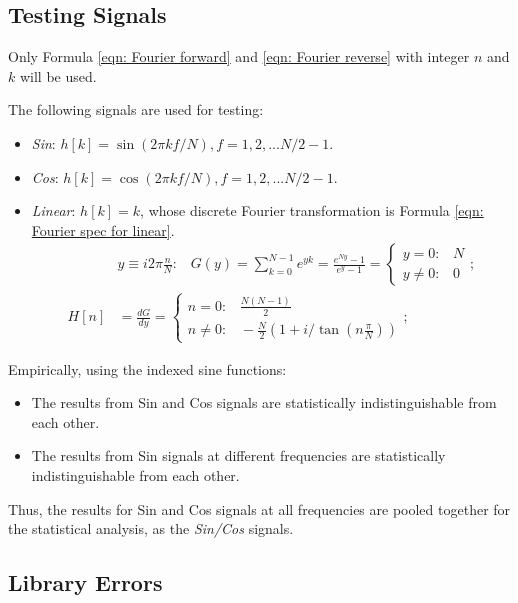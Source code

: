 \documentclass[twoside]{article}
\numberwithin{equation}{section}
\newcommand{\eqspace}{\;\;\;}
\begin{document}
\subsection{Testing Signals}

Only Formula \eqref{eqn: Fourier forward} and \eqref{eqn: Fourier reverse} with integer $n$ and $k$ will be used.

The following signals are used for testing:
\begin{itemize}
\item \emph{Sin}: $h[k] = \sin(2\pi k f/N), f = 1, 2, ... N/2 -1$.

\item \emph{Cos}: $h[k] = \cos(2\pi k f/N), f = 1, 2, ... N/2 -1$.

\item \emph{Linear}: $h[k] = k$, whose discrete Fourier transformation is Formula \eqref{eqn: Fourier spec for linear}.
\begin{align}
& y \equiv i 2\pi \frac{n}{N}: \eqspace G(y) = \sum_{k=0}^{N-1}  e^{y k} = \frac{e^{N y} - 1}{e^y - 1}
 = \begin{cases} y = 0: \eqspace N \\ y \neq 0: \eqspace 0 \end{cases}; \nonumber \\
\label{eqn: Fourier spec for linear}
H[n] &= \frac{d G}{d y} = \begin{cases} n = 0: \eqspace \frac{N (N-1)}{2} \\ n \neq 0: \eqspace - \frac{N}{2}(1 + i /\tan(n \frac{\pi}{N})) \end{cases};
\end{align}

\end{itemize}

Empirically, using the indexed sine functions:
\begin{itemize}
\item The results from Sin and Cos signals are statistically indistinguishable from each other.

\item The results from Sin signals at different frequencies are statistically indistinguishable from each other.
\end{itemize}
Thus, the results for Sin and Cos signals at all frequencies are pooled together for the statistical analysis, as the \emph{Sin/Cos} signals.


\subsection{Library Errors}
\end{document}

